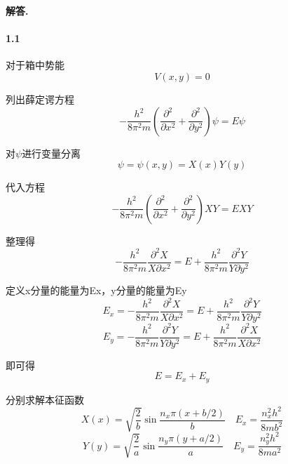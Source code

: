 \documentclass[12pt, a4paper, oneside]{ctexart}
\newenvironment{solution}{\par\noindent\textbf{解答. }}{\\\par}
\begin{document}
\begin{solution}

    \paragraph{1.1}

    对于箱中势能
    \begin{equation}
        V(x,y)=0
    \end{equation}

    列出薛定谔方程
    \begin{equation}
        -\frac{h^2}{8\pi^2 m}\left ( \frac{\partial^2}{\partial x^2} +\frac{\partial^2}{\partial y^2}\right ) \psi=E\psi
    \end{equation}

    对$\psi$进行变量分离
    \begin{equation}
        \psi=\psi(x,y)=X(x)Y(y)
    \end{equation}

    代入方程
    \begin{equation}
        -\frac{h^2}{8\pi^2 m}\left ( \frac{\partial^2}{\partial x^2} +\frac{\partial^2}{\partial y^2}\right ) XY=EXY
    \end{equation}

    整理得
    \begin{equation}
        -\frac{h^2}{8\pi^2 m}\frac{\partial^2X}{X\partial x^2}=E+\frac{h^2}{8\pi^2 m}  \frac{\partial^2Y}{Y\partial y^2}
    \end{equation}

    定义x分量的能量为Ex，y分量的能量为Ey
    \begin{equation}
        E_x = -\frac{h^2}{8\pi^2 m}\frac{\partial^2X}{X\partial x^2}=E+\frac{h^2}{8\pi^2 m} \frac{\partial^2Y}{Y\partial y^2}
    \end{equation}
    \begin{equation}
        E_y = -\frac{h^2}{8\pi^2 m}\frac{\partial^2Y}{Y\partial y^2}=E+\frac{h^2}{8\pi^2 m} \frac{\partial^2X}{X\partial x^2}
    \end{equation}

    即可得
    \begin{equation}
        E=E_x+E_y
    \end{equation}

    分别求解本征函数
    \begin{equation}
        X(x)=\sqrt{\frac2b}\sin\frac{n_x\pi (x+b/2)}{b}\quad E_x=\frac{n_x^2h^2}{8mb^2}
    \end{equation}
    \begin{equation}
        Y(y)=\sqrt{\frac2a}\sin\frac{n_y\pi (y+a/2)}{a}\quad E_y=\frac{n_y^2h^2}{8ma^2}
    \end{equation}


\end{solution}
\end{document}
